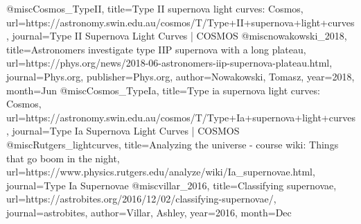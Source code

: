 @misc{Cosmos_TypeII, 
	title={Type II supernova light curves: Cosmos}, 
	url={https://astronomy.swin.edu.au/cosmos/T/Type+II+supernova+light+curves}, 
	journal={Type II Supernova Light Curves | COSMOS}
	}
@misc{nowakowski_2018, 
	title={Astronomers investigate type IIP supernova with a long plateau}, 
	url={https://phys.org/news/2018-06-astronomers-iip-supernova-plateau.html}, 
	journal={Phys.org}, 
	publisher={Phys.org}, 
	author={Nowakowski, Tomasz}, 
	year={2018}, 
	month={Jun}
	} 
@misc{Cosmos_TypeIa, 
	title={Type ia supernova light curves: Cosmos}, 
	url={https://astronomy.swin.edu.au/cosmos/T/Type+Ia+supernova+light+curves}, 
	journal={Type Ia Supernova Light Curves | COSMOS}
	} 
@misc{Rutgers_lightcurves, 
	title={Analyzing the universe - course wiki: Things that go boom in the night}, 
	url={https://www.physics.rutgers.edu/analyze/wiki/Ia_supernovae.html}, 
	journal={Type Ia Supernovae}
	}
@misc{villar_2016, 
	title={Classifying supernovae}, 
	url={https://astrobites.org/2016/12/02/classifying-supernovae/}, 
	journal={astrobites}, 
	author={Villar, Ashley}, 
	year={2016}, 
	month={Dec}
	} 

